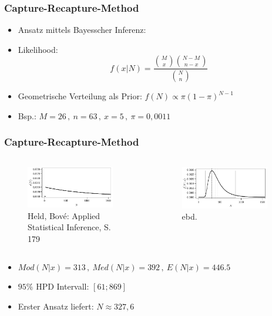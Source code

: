 \documentclass[aspectratio=169,xcolor=dvipsnames]{beamer}
\begin{document}
\begin{frame}
\frametitle{Capture-Recapture-Method}
\begin{itemize}
\item<1-> Ansatz mittels Bayesscher Inferenz:
\item<2-> Likelihood: $$f(x|N)=\frac{\binom{M}{x}\binom{N-M}{n-x}}{\binom{N}{n}}$$
\item<3-> Geometrische Verteilung als Prior: $f(N)\propto \pi(1-\pi)^{N-1}$
\item<4-> Bsp.: $M=26\, ,~n=63\, ,~x=5\, ,~\pi=0,0011$
\end{itemize}
\end{frame}

\begin{frame}
\frametitle{Capture-Recapture-Method}
\begin{columns}
\begin{column}{0.5\textwidth}
\begin{figure}
\includegraphics[width=0.9\textwidth]{geom}
\caption{Held, Bov\'{e}: Applied Statistical Inference, S. 179}
\end{figure}
\end{column}
\begin{column}{0.5\textwidth}
\begin{figure}
\includegraphics[width=0.9\textwidth]{capture-recapture}
\caption{ebd.}
\end{figure}
\end{column}
\end{columns}
\begin{itemize}
\item<1-> $Mod(N|x)=313\, ,~Med(N|x)=392\, ,~E(N|x)=446.5$
\item<2-> $95\%$ HPD Intervall: $[61; 869]$
\item<3-> Erster Ansatz liefert: $N\approx 327,6$
\end{itemize}
\end{frame}
\end{document}
